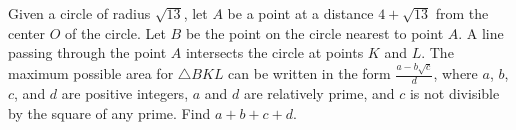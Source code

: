 Given a circle of radius $\sqrt{13}$, let $A$ be a point at a distance $4 + \sqrt{13}$ from the center $O$ of the circle.  Let $B$ be the point on the circle nearest to point $A$.  A line passing through the point $A$ intersects the circle at points $K$ and $L$.  The maximum possible area for $\triangle BKL$ can be written in the form $\tfrac{a-b\sqrt{c}}{d}$, where $a$, $b$, $c$, and $d$ are positive integers, $a$ and $d$ are relatively prime, and $c$ is not divisible by the square of any prime.  Find $a+b+c+d$.